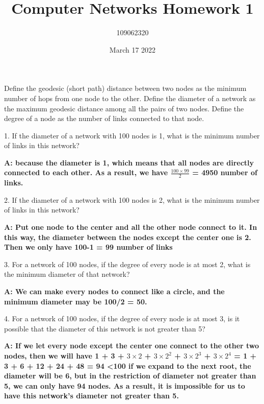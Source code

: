 \documentclass{article}
\title{Computer Networks Homework  1}
\author{109062320}
\date{March 17 2022}
\begin{document}
 
\maketitle 
Define the geodesic (short path) distance between two nodes as the minimum number of hops from one node to the other. Define the diameter of a network as the maximum geodesic distance among all the pairs of two nodes. Define the degree of a node as the number of links connected to that node.


1. If the diameter of a network with 100 nodes is 1, what is the minimum number of links in this network?

\textbf{A:
because the diameter is 1, which means that all nodes are directly connected to each other.
As a result, we have $\frac{100\times 99}{2}$ = 4950 number of links.
}

2. If the diameter of a network with 100 nodes is 2, what is the minimum number of links in this network?

\textbf{A:
Put one node to the center and all the other node connect to it.
In this way, the diameter between the nodes except the center one is 2.
Then we only have 100-1 = 99 number of links
}

3. For a network of 100 nodes, if the degree of every node is at most 2, what is the minimum diameter of that network?

\textbf{A:
We can make every nodes to connect like a circle, and the minimum diameter may be 100/2 = 50.
}

4. For a network of 100 nodes, if the degree of every node is at most 3, is it possible that the diameter of this network is not greater than 5? 

\textbf{A:
If we let every node except the center one connect to the other two nodes,
then we will have 1 + 3 + ${3\times 2}$ + ${3\times 2^{2}}$ + ${3\times 2^{3}}$ + ${3\times 2^{4}}$
= 1 + 3 + 6 + 12 + 24 + 48 = 94 \textless 100
if we expand to the next root, the diameter will be 6, but in the restriction of diameter not greater than 5, we can only have 94 nodes.
As a result, it is impossible for us to have this network's diameter not greater than 5.
}
\end{document}
